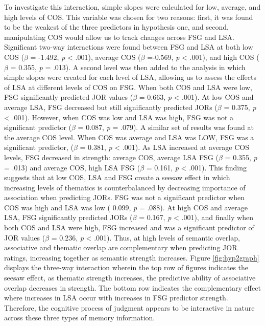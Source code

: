 \documentclass[english,,man]{apa6}
\begin{document}
To investigate this interaction, simple slopes were calculated for low,
average, and high levels of COS. This variable was chosen for two
reasons: first, it was found to be the weakest of the three predictors
in hypothesis one, and second, manipulating COS would allow us to track
changes across FSG and LSA. Significant two-way interactions were found
between FSG and LSA at both low COS (\(\beta\) = -1.492, \emph{p}
\textless{} .001), average COS (\(\beta\) =-0.569, \emph{p} \textless{}
.001), and high COS (\(\beta\) = 0.355, \emph{p} = .013). A second level
was then added to the analysis in which simple slopes were created for
each level of LSA, allowing us to assess the effects of LSA at different
levels of COS on FSG. When both COS and LSA were low, FSG significantly
predicted JOR values (\(\beta\) = 0.663, \emph{p} \textless{} .001). At
low COS and average LSA, FSG decreased but still significantly predicted
JORs (\(\beta\) = 0.375, \emph{p} \textless{} .001). However, when COS
was low and LSA was high, FSG was not a significant predictor (\(\beta\)
= 0.087, \emph{p} = .079). A similar set of results was found at the
average COS level. When COS was average and LSA was LOW, FSG was a
significant predictor, (\(\beta\) = 0.381, \emph{p} \textless{} .001).
As LSA increased at average COS levels, FSG decreased in strength:
average COS, average LSA FSG (\(\beta\) = 0.355, \emph{p} = .013) and
average COS, high LSA FSG (\(\beta\) = 0.161, \emph{p} \textless{}
.001). This finding suggests that at low COS, LSA and FSG create a
seesaw effect in which increasing levels of thematics is counterbalanced
by decreasing importance of association when predicting JORs. FSG was
not a significant predictor when COS was high and LSA was low ( 0.099,
\emph{p} = .088). At high COS and average LSA, FSG significantly
predicted JORs (\(\beta\) = 0.167, \emph{p} \textless{} .001), and
finally when both COS and LSA were high, FSG increased and was a
significant predictor of JOR values (\(\beta\) = 0.236, \emph{p}
\textless{} .001). Thus, at high levels of semantic overlap, associative
and thematic overlap are complementary when predicting JOR ratings,
increasing together as semantic strength increases. Figure
\ref{fig:hyp2graph} displays the three-way interaction wherein the top
row of figures indicates the seesaw effect, as thematic strength
increases, the predictive ability of associative overlap decreases in
strength. The bottom row indicates the complementary effect where
increases in LSA occur with increases in FSG predictor strength.
Therefore, the cognitive process of judgment appears to be interactive
in nature across these three types of memory information.
\end{document}
